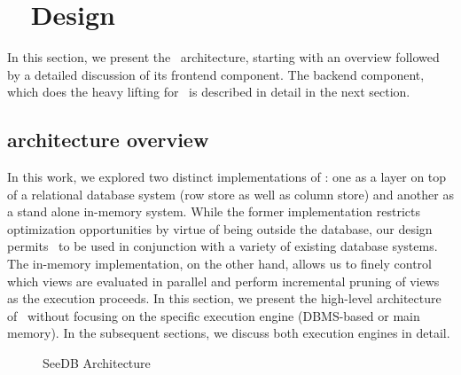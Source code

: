 

\section{{\large \SeeDB\ } Design}
\label{sec:system_architecture}

In this section, we present the \SeeDB\ architecture, starting with an
overview followed by a detailed discussion of its frontend component.
The backend component, which does the heavy lifting for \SeeDB\ is described
in detail in the next section.

\subsection{{\large \SeeDB} architecture overview}
\label{subsec:overview}

In this work, we explored two distinct implementations of \SeeDB: one as a
layer on top of a relational database system (row store as well as column
store) and another as a stand alone in-memory system. 
While the former
implementation restricts optimization opportunities by virtue of being outside
the database, our design permits \SeeDB\ to be used in conjunction with a
variety of existing database systems.
The in-memory implementation, on the other hand, allows us to finely control
which views are evaluated in parallel and perform incremental pruning of views
as the execution proceeds. 
In this section, we present the high-level architecture of
\SeeDB\ without focusing on the specific execution engine (DBMS-based or main
memory). In the subsequent sections, we discuss both execution engines in
detail.

\begin{figure}[htb]
\vspace{-10pt}
\centerline{
\hbox{}}
\caption{SeeDB Architecture}
\label{fig:sys-arch}
\vspace{-12pt}
\end{figure} 

